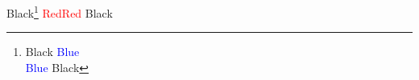 \documentclass[12pt,a5paper]{article}
\begin{document}
  Black\footnote{Black \textcolor{blue}{Blue\\Blue} Black} %
  \textcolor{red}{Red\newpage Red} Black%
\end{document}
